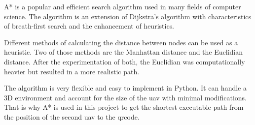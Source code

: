 A* is a popular and efficient search algorithm used in many fields of computer science. The algorithm is an extension of Dijkstra's algorithm with characteristics of breath-first search and the enhancement of heuristics. \cite{a_star_brilliant}

Different methods of calculating the distance between nodes can be used as a heuristic. Two of those methods are the Manhattan distance and the Euclidian distance. After the experimentation of both, the Euclidian was computationally heavier but resulted in a more realistic path.

The algorithm is very flexible and easy to implement in Python. It can handle a 3D environment and account for the size of the \acs{uav} with minimal modifications. That is why A* is used in this project to get the shortest executable path from the position of the second \acs{uav} to the \acs{qrcode}.